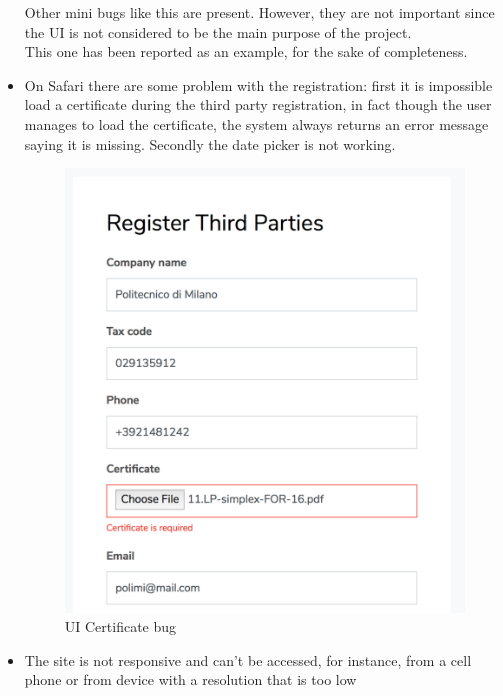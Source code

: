 \begin{itemize}
Other mini bugs like this are present. However, they are not important since the 
UI is not considered to be the main purpose of the project. \\
This one has been reported as an example, for the sake of completeness.

\item 
On Safari there are some problem with the registration: first it is impossible load a
certificate during the third party registration, in fact though the user manages to load the
certificate, the system always returns an error message saying it is missing. Secondly the
date picker is not working.

\begin{figure}[H]
\includegraphics[width=0.6\linewidth]{images/certificateBug}
\centering
\caption{ UI Certificate bug }
\label{fig:certificatebug}
\end{figure}

\item 
The site is not responsive and can't be accessed, for instance, from a cell phone or from device with a resolution that is too low

\end{itemize}